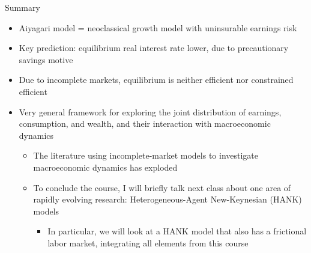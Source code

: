 \documentclass[9pt]{beamer}
\newcommand{\bit}{\begin{itemize}}
\newcommand{\eit}{\end{itemize}}
\begin{document}
\begin{frame}{Summary}
\bit
\setlength\itemsep{2em}

\item Aiyagari model = neoclassical growth model with uninsurable earnings risk

\item Key prediction: equilibrium real interest rate lower, due to precautionary savings motive

\item Due to incomplete markets, equilibrium is neither efficient nor constrained efficient

\item Very general framework for exploring the joint distribution of earnings, consumption, and wealth, and their interaction with macroeconomic dynamics
\bit
\setlength\itemsep{0.5em}
	\item The literature using incomplete-market models to investigate macroeconomic dynamics has exploded

	\item To conclude the course, I will briefly talk next class about one area of rapidly evolving research: Heterogeneous-Agent New-Keynesian (HANK) models
	\bit
		\item In particular, we will look at a HANK model that also has a frictional labor market, integrating all elements from this course
	\eit
\eit

\eit

\end{frame}
\end{document}

